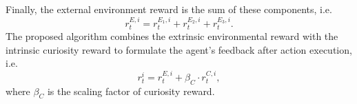 \documentclass[conference]{IEEEtran}
\begin{document}
Finally, the external environment reward is the sum of these components, i.e.
\begin{equation}\label{ext_reward}
  r^{E,i}_{t}=r^{E_1,i}_{t}+r^{E_2,i}_{t}+r^{E_3,i}_{t}.
\end{equation}
The proposed algorithm combines the extrinsic environmental reward with the intrinsic curiosity reward to formulate the agent’s feedback after action execution, i.e.
\begin{equation}\label{tol_reward}
  r^{i}_{t}=r^{E,i}_{t}+\beta_C \cdot r^{C,i}_{t},
\end{equation}
where $\beta_C$ is the scaling factor of curiosity reward. 
\end{document}
